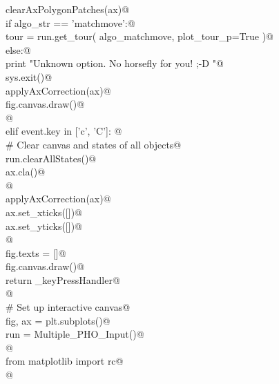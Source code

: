 \documentclass[10pt, english, oneside]{report}
\begin{document}
\begin{appendices}
\begin{flushleft}
\begin{list}{}{}
\mbox{}\verb@                    clearAxPolygonPatches(ax)@\\
\mbox{}\verb@                    if   algo_str == 'matchmove':@\\
\mbox{}\verb@                          tour = run.get_tour( algo_matchmove, plot_tour_p=True )@\\
\mbox{}\verb@                    else:@\\
\mbox{}\verb@                          print "Unknown option. No horsefly for you! ;-D "@\\
\mbox{}\verb@                          sys.exit()@\\
\mbox{}\verb@                    applyAxCorrection(ax)@\\
\mbox{}\verb@                    fig.canvas.draw()@\\
\mbox{}\verb@                    @\\
\mbox{}\verb@               elif event.key in ['c', 'C']: @\\
\mbox{}\verb@                    # Clear canvas and states of all objects@\\
\mbox{}\verb@                    run.clearAllStates()@\\
\mbox{}\verb@                    ax.cla()@\\
\mbox{}\verb@                                  @\\
\mbox{}\verb@                    applyAxCorrection(ax)@\\
\mbox{}\verb@                    ax.set_xticks([])@\\
\mbox{}\verb@                    ax.set_yticks([])@\\
\mbox{}\verb@                                     @\\
\mbox{}\verb@                    fig.texts = []@\\
\mbox{}\verb@                    fig.canvas.draw()@\\
\mbox{}\verb@           return _keyPressHandler@\\
\mbox{}\verb@    @\\
\mbox{}\verb@    # Set up interactive canvas@\\
\mbox{}\verb@    fig, ax =  plt.subplots()@\\
\mbox{}\verb@    run = Multiple_PHO_Input()@\\
\mbox{}\verb@        @\\
\mbox{}\verb@    from matplotlib import rc@\\
\mbox{}\verb@    @\\

\end{list}
\end{flushleft}
\end{appendices}
\end{document}

